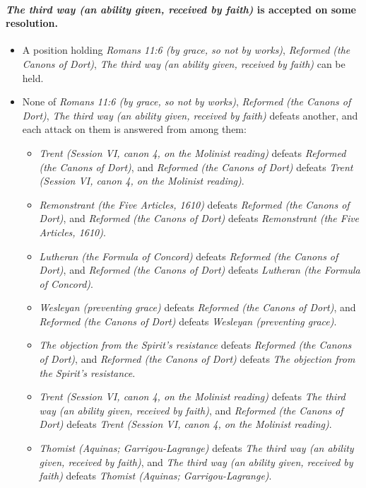 \documentclass[11pt]{article}
\begin{document}
\paragraph{\emph{The third way (an ability given, received by faith)} is accepted on some resolution.}
\begin{itemize}
\item A position holding \emph{Romans 11:6 (by grace, so not by works)}, \emph{Reformed (the Canons of Dort)}, \emph{The third way (an ability given, received by faith)} can be held.
\item None of \emph{Romans 11:6 (by grace, so not by works)}, \emph{Reformed (the Canons of Dort)}, \emph{The third way (an ability given, received by faith)} defeats another, and each attack on them is answered from among them:
\begin{itemize}
\item \emph{Trent (Session VI, canon 4, on the Molinist reading)} defeats \emph{Reformed (the Canons of Dort)}, and \emph{Reformed (the Canons of Dort)} defeats \emph{Trent (Session VI, canon 4, on the Molinist reading)}.
\item \emph{Remonstrant (the Five Articles, 1610)} defeats \emph{Reformed (the Canons of Dort)}, and \emph{Reformed (the Canons of Dort)} defeats \emph{Remonstrant (the Five Articles, 1610)}.
\item \emph{Lutheran (the Formula of Concord)} defeats \emph{Reformed (the Canons of Dort)}, and \emph{Reformed (the Canons of Dort)} defeats \emph{Lutheran (the Formula of Concord)}.
\item \emph{Wesleyan (preventing grace)} defeats \emph{Reformed (the Canons of Dort)}, and \emph{Reformed (the Canons of Dort)} defeats \emph{Wesleyan (preventing grace)}.
\item \emph{The objection from the Spirit’s resistance} defeats \emph{Reformed (the Canons of Dort)}, and \emph{Reformed (the Canons of Dort)} defeats \emph{The objection from the Spirit’s resistance}.
\item \emph{Trent (Session VI, canon 4, on the Molinist reading)} defeats \emph{The third way (an ability given, received by faith)}, and \emph{Reformed (the Canons of Dort)} defeats \emph{Trent (Session VI, canon 4, on the Molinist reading)}.
\item \emph{Thomist (Aquinas; Garrigou-Lagrange)} defeats \emph{The third way (an ability given, received by faith)}, and \emph{The third way (an ability given, received by faith)} defeats \emph{Thomist (Aquinas; Garrigou-Lagrange)}.
\end{itemize}
\end{itemize}
\end{document}
